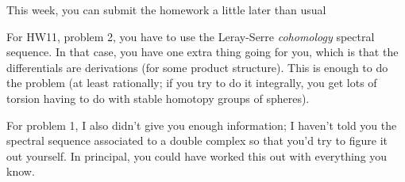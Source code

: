 
\def\pd{\pb}

This week, you can submit the homework a little later than usual

For HW11, problem 2, you have to use the Leray-Serre \emph{cohomology} spectral sequence. In that case, you have one extra thing going for you, which is that the differentials are derivations (for some product structure). This is enough to do the problem (at least rationally; if you try to do it integrally, you get lots of torsion having to do with stable homotopy groups of spheres).

For problem 1, I also didn't give you enough information; I haven't told you the spectral sequence associated to a double complex so that you'd try to figure it out yourself. In principal, you could have worked this out with everything you know.

